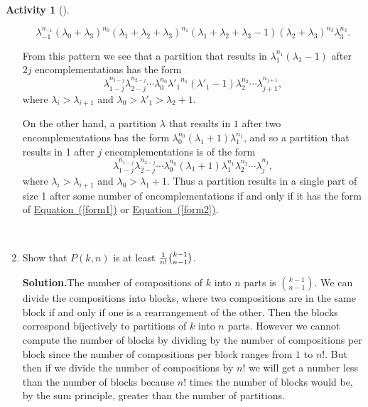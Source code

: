 \documentclass[10pt,]{book}
\theoremstyle{plain}
\theoremstyle{definition}
\newtheorem{activity}[project]{Activity}
\numberwithin{equation}{chapter}
\begin{document}
\begin{activity}[]
\begin{enumerate}[label=(\alph*)]
\begin{equation*}
\lambda_{-1}^{n_{-1}}(\lambda_0+\lambda_{3})^{n_0}(\lambda_1+
\lambda_2 +
\lambda_{3})^{n_1}(\lambda_1+\lambda_2 +\lambda_3-1)(\lambda_2+
\lambda_{3})^{n_3}
\lambda_3^{n_3}.
\end{equation*}
%
\par
From this pattern we see that a partition that results in \(\lambda_1^{n_1}(\lambda_1-1)\) after \(2j\) encomplementations has the form%
\begin{equation}
\lambda_{1-j}^{n_{1-j}}\lambda_{2-j}^{n_{2-j}}\cdots
\lambda_0^{n_0}
{\lambda'_1}^{n_1}
(\lambda'_1-1)\lambda_2^{n_2}\cdots
\lambda_{j+1}^{n_{j+1}},\label{form1}
\end{equation}
where \(\lambda_i>\lambda_{i+1}\) and \(\lambda_0>\lambda'_1>\lambda_2+1\).%
\par
On the other hand, a partition \(\lambda\) that results in \(1\) after two encomplementations has the form \(\lambda_0^{n_0}(\lambda_1+1)\lambda_1^{n_1}\), and so a partition that results in 1 after \(j\) encomplementations is of the form%
\begin{equation}
\lambda_{1-j}^{n_{1-j}}\lambda_{2-j}^{n_{2-j}}\cdots
\lambda_0^{n_0}(\lambda_1+1)\lambda_1^{n_1}\lambda_2^{n_2}\cdots
\lambda_j^{n_j},\label{form2}
\end{equation}
where \(\lambda_i>\lambda_{i+1}\) and \(\lambda_0>\lambda_1+1\). Thus a partition results in a single part of size 1 after some number of encomplementations if and only if it has the form of \hyperref[form1]{Equation~(\ref{form1})} or \hyperref[form2]{Equation~(\ref{form2})}.%

~\par
\item Show that \(P(k,n)\) is at least \({1\over n!}{k-1\choose n-1}\).%
\par\medskip\noindent%
\textbf{Solution.}\quad The number of compositions of \(k\) into \(n\) parts is \(k-1\choose n-1\). We can divide the compositions into blocks, where two compositions are in the same block if and only if one is a rearrangement of the other. Then the blocks correspond bijectively to partitions of \(k\) into \(n\) parts. However we cannot compute the number of blocks by dividing by the number of compositions per block since the number of compositions per block ranges from \(1\) to \(n!\). But then if we divide the number of compositions by \(n!\) we will get a number less than the number of blocks because \(n!\) times the number of blocks would be, by the sum principle, greater than the number of partitions.%

\end{enumerate}
\end{activity}
\end{document}
